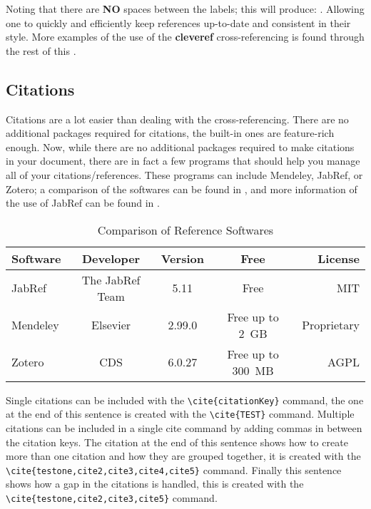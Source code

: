     Noting that there are \textbf{NO} spaces between the labels; this will produce: . Allowing one to quickly and efficiently keep references up-to-date and consistent in their style.
    More examples of the use of the \textbf{cleveref} cross-referencing is found through the rest of this .
  \subsection{Citations}\label{subsec:citations}
      Citations are a lot easier than dealing with the cross-referencing.
      There are no additional packages required for citations, the built-in ones are feature-rich enough.
      Now, while there are no additional packages required to make citations in your document, there are in fact a few programs that should help you manage all of your citations/references.
      These programs can include Mendeley, JabRef, or Zotero; a comparison of the softwares can be found in , and more information of the use of JabRef can be found in .
      
      \begin{table}[htbp]
          \centering
          \caption{Comparison of Reference Softwares}\label{tab:refSoftware}%
            \begin{tabularx}{0.9\textwidth}{Lcccr}
                \toprule
                    Software & Developer & Version & Free & License \\
                \midrule
                    JabRef   & The JabRef Team & 5.11   & Free   & MIT \\
                    Mendeley & Elsevier          & 2.99.0 & {Free up to 2 GB} & Proprietary \\
                    Zotero   & CDS               & 6.0.27 & {Free  up to 300 MB} & AGPL \\
                \bottomrule
            \end{tabularx}%
      \end{table}%
      
      Single citations can be included with the \lstinline|\cite{citationKey}| command, the one at the end of this sentence is created with the \lstinline|\cite{TEST}| command\cite{TEST}. 
      Multiple citations can be included in a single cite command by adding commas in between the citation keys. The citation at the end of this sentence shows how to create more than one citation and how they are grouped together, it is created with the \lstinline|\cite{testone,cite2,cite3,cite4,cite5}| command\cite{testone,cite2,cite3,cite4,cite5}.
      Finally this sentence shows how a gap in the citations is handled, this is created with the \lstinline|\cite{testone,cite2,cite3,cite5}| command\cite{testone,cite2,cite3,cite5}. 
